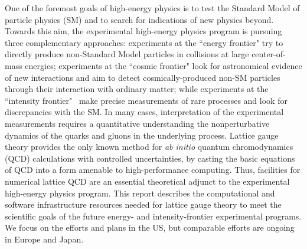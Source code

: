 One of the foremost goals of high-energy physics is to test the
Standard Model of particle physics (SM) and to search for indications of
new physics beyond.  Towards this aim, the experimental high-energy
physics program is pursuing 
three complementary approaches: experiments
at the ``energy frontier" try to directly produce non-Standard Model
particles in collisions at large center-of-mass energies;
experiments at the ``cosmic frontier" look for
  astronomical evidence of new interactions and aim to detect
  cosmically-produced non-SM particles through their interaction with
  ordinary matter; while experiments at the ``intensity
frontier"~\cite{Hewett:2012ns} make precise measurements of rare
processes and look for discrepancies with
the SM.   In many cases, interpretation of the experimental measurements requires a quantitative understanding the nonperturbative dynamics of the quarks and gluons in the underlying process.  Lattice gauge theory provides the only known method
for \emph{ab initio} quantum chromodynamics (QCD) calculations with controlled uncertainties, by casting
the basic equations of QCD into a form amenable to high-performance
computing.  Thus, facilities for numerical lattice QCD are an
essential theoretical adjunct to the experimental high-energy physics
program.  This report describes the computational and software infrastructure resources needed for lattice gauge theory to meet the scientific goals of the future energy- and intensity-frontier experimental programs.  We focus on the efforts and plans in the US, but comparable efforts are ongoing in Europe and Japan.


